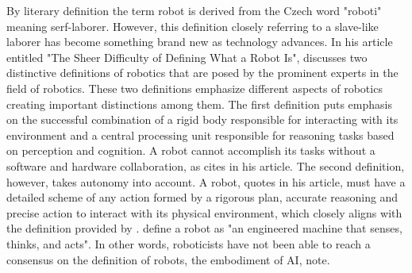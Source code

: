 \documentclass[man]{apa6}
\begin{document}
By literary definition the term robot is derived from the Czech word "roboti" meaning serf-laborer. 
However, this definition closely referring to a slave-like laborer has become something brand new as technology advances.
In his article entitled "The Sheer Difficulty of Defining What a Robot Is",  discusses two distinctive definitions of robotics that are posed by the prominent experts in the field of robotics.
These two definitions emphasize different aspects of robotics creating important distinctions among them.
The first definition puts emphasis on the successful combination of a rigid body responsible for interacting with its environment and a central processing unit responsible for reasoning tasks based on perception and cognition.
A robot cannot accomplish its tasks without a software and hardware collaboration, as  cites in his article.
The second definition, however, takes autonomy into account.
A robot,  quotes in his article, must have a detailed scheme of any action formed by a rigorous plan, accurate reasoning and precise action to interact with its physical environment, which closely aligns with the definition provided by \citeauthor{lin} \citeyear{lin}. 
\citeauthor{lin} \citeyear[p.~943]{lin} define a robot as "an engineered machine that senses, thinks, and acts".
In other words, roboticists have not been able  to reach a consensus on the definition of robots, the embodiment of AI,  note.
\par
\end{document}
